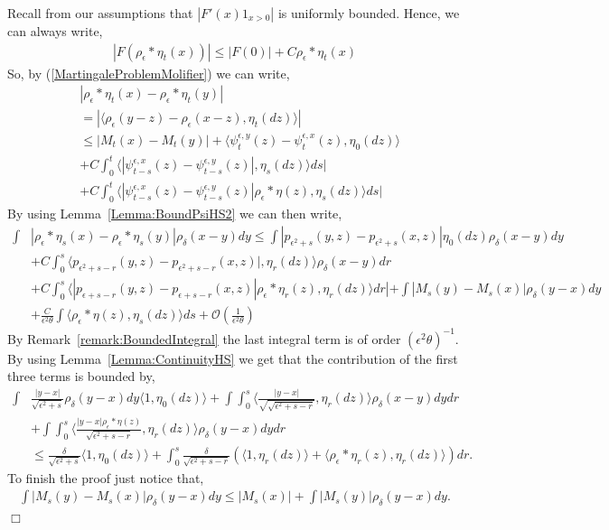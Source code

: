 \documentclass[12pt]{article}
\newenvironment {proof}{{\noindent\bf Proof }}{\hfill $\Box$ \medskip}
\begin{document}
\begin{proof}
Recall from our assumptions that $|F'(x)1_{x>0}|$ is uniformly bounded. Hence, we can always write,
\begin{align} \label{StrongBoundOnF}
|F(\rho_\epsilon*\eta_t(x))| \leq |F(0)| + C \rho_\epsilon*\eta_t(x)
\end{align}
So, by (\ref{MartingaleProblemMolifier}) we can write,
\begin{align}
& |\rho_\epsilon*\eta_t(x)-\rho_\epsilon*\eta_t(y)| \nonumber \\ &= |\langle \rho_\epsilon(y-z)-\rho_\epsilon(x-z),\eta_t(dz) \rangle | \nonumber\\ &\leq  |M_t(x)-M_t(y)|  +\langle \psi_t^{\epsilon,y}(z)-\psi_t^{\epsilon,x}(z), \eta_0(dz)\rangle \nonumber \\ &+ C\int_0^t \langle |\psi_{t-s}^{\epsilon,x}(z) - \psi_{t-s}^{\epsilon, y}(z) |, \eta_s(dz) \rangle  ds | \\ &+ C \int_0^t \langle |\psi_{t-s}^{\epsilon,x}(z) - \psi_{t-s}^{\epsilon, y}(z) | \rho_\epsilon*\eta(z), \eta_s(dz) \rangle  ds | \label{eq:bound1CE} \end{align} 
By using Lemma~\ref{Lemma:BoundPsiHS2} we can then write, 
\begin{align*}
 \int &|\rho_\epsilon*\eta_s(x) -\rho_\epsilon*\eta_s(y)| \rho_\delta(x-y) dy  \leq \int |p_{\epsilon^2+s}(y,z)-p_{\epsilon^2+s}(x,z)|\eta_0(dz) \rho_\delta(x-y)dy \\&+ C\int_0^s \langle p_{\epsilon^2+s-r}(y,z)-p_{\epsilon^2+s-r}(x,z)|, \eta_r(dz) \rangle \rho_\delta (x-y) dr  \\  & + C \int_0^s \langle |p_{\epsilon+s-r}(y,z) - p_{\epsilon+s-r}(x,z) | \rho_\epsilon*\eta_r(z), \eta_r(dz) \rangle  dr | + \int|M_s(y)-M_s(x)| \rho_\delta(y-x)dy  \\  & + \frac{C}{\epsilon^2 \theta} \int \langle \rho_\epsilon*\eta(z),\eta_s(dz)\rangle ds   +\mathcal{O}\left( \frac{1}{\epsilon^2 \theta} \right) 
\end{align*}
By Remark~\ref{remark:BoundedIntegral} the last integral term is of order $(\epsilon^2 \theta)^{-1}$. By using Lemma~\ref{Lemma:ContinuityHS} we get that the contribution of the first three terms is bounded by,
\begin{align*}
\int &\frac{|y-x|}{\sqrt{\epsilon^2+s}} \rho_{\delta}(y-x) dy \langle 1, \eta_0(dz)\rangle + \int \int_0^s  \langle \frac{|y-x|}{\sqrt{\sqrt{\epsilon^2+s-r}}}, \eta_r(dz) \rangle \rho_\delta(x-y) dy dr \\ & +  \int \int_0^s \langle \frac{|y-x| \rho_\epsilon*\eta(z)}{\sqrt{\epsilon^2+s-r}}, \eta_r(dz) \rangle \rho_\delta(y-x) dy dr \\ & \leq \frac{\delta}{\sqrt{\epsilon^2+s}} \langle 1, \eta_0(dz) \rangle + \int_0^s \frac{\delta}{\sqrt{\epsilon^2+s-r}} (\langle 1, \eta_r(dz) \rangle + \langle \rho_\epsilon*\eta_r(z), \eta_r(dz) \rangle) dr.
\end{align*}
To finish the proof just notice that,
\begin{align*}
\int |M_s(y)-M_s(x)| \rho_\delta(y-x)dy \leq |M_s(x)| + \int |M_s(y)| \rho_\delta(y-x)dy.
\end{align*}
\end{proof}
\end{document}
